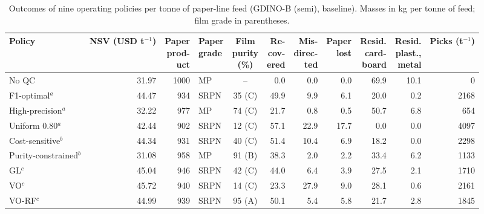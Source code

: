 \begin{table}[!htbp]\centering
\begingroup\linespread{1}\selectfont\footnotesize\setlength{\tabcolsep}{2.5pt}
\caption{Outcomes of nine operating policies per tonne of paper-line feed (GDINO-B (semi), baseline). Masses in kg per tonne of feed; film grade in parentheses.}\label{tab:policies}
\begin{tabular*}{\textwidth}{@{\extracolsep{\fill}}lrrlcrrrrrr@{}}\toprule
Policy & \shortstack{NSV\\(USD\\t$^{-1}$)} & \shortstack{Paper\\prod-\\uct} & \shortstack{Paper\\grade} & \shortstack{Film\\purity\\(\%)} & \shortstack{Re-\\cov-\\ered} & \shortstack{Mis-\\direc-\\ted} & \shortstack{Paper\\lost} & \shortstack{Resid.\\card-\\board} & \shortstack{Resid.\\plast.,\\metal} & \shortstack{Picks\\(t$^{-1}$)}\\\midrule
No QC & 31.97 & 1000 & MP & -- & 0.0 & 0.0 & 0.0 & 69.9 & 10.1 & 0\\
\addlinespace[3pt]
F1-optimal$^{a}$ & 44.47 & 934 & SRPN & 35 (C) & 49.9 & 9.9 & 6.1 & 20.0 & 0.2 & 2168\\
High-precision$^{a}$ & 32.22 & 977 & MP & 74 (C) & 21.7 & 0.8 & 0.5 & 50.7 & 6.8 & 654\\
Uniform 0.80$^{a}$ & 42.44 & 902 & SRPN & 12 (C) & 57.1 & 22.9 & 17.7 & 0.0 & 0.0 & 4097\\
\addlinespace[3pt]
Cost-sensitive$^{b}$ & 44.34 & 931 & SRPN & 40 (C) & 51.4 & 10.4 & 6.9 & 18.2 & 0.0 & 2298\\
Purity-constrained$^{b}$ & 31.08 & 958 & MP & 91 (B) & 38.3 & 2.0 & 2.2 & 33.4 & 6.2 & 1133\\
\addlinespace[3pt]
GL$^{c}$ & 45.04 & 946 & SRPN & 42 (C) & 44.0 & 6.4 & 3.9 & 27.5 & 2.1 & 1710\\
VO$^{c}$ & 45.72 & 940 & SRPN & 14 (C) & 23.3 & 27.9 & 9.0 & 28.1 & 0.6 & 2161\\
VO-RF$^{c}$ & 44.99 & 939 & SRPN & 95 (A) & 50.1 & 5.4 & 5.8 & 21.7 & 2.8 & 1845\\

\end{tabular*}
\end{table}
